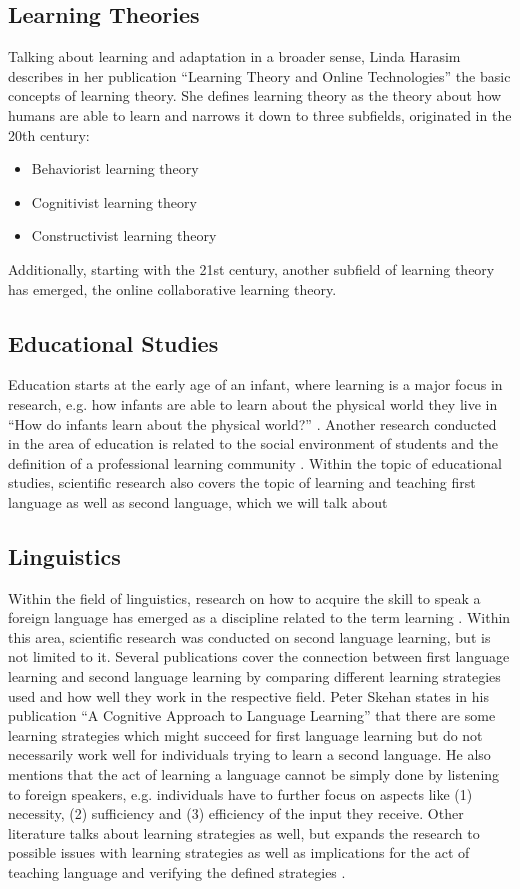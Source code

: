 \documentclass[conference]{IEEEtran}
\begin{document}
	\subsection{Learning Theories}\label{LT}
		Talking about learning and adaptation in a broader sense, Linda Harasim describes in her publication “Learning Theory and Online Technologies” \cite{d1} the basic concepts of learning theory. She defines learning theory as the theory about how humans are able to learn and narrows it down to three subfields, originated in the 20th century:
		\begin{itemize}
			\item Behaviorist learning theory
			\item Cognitivist learning theory
			\item Constructivist learning theory
		\end{itemize}

		Additionally, starting with the 21st century, another subfield of learning theory has emerged, the online collaborative learning theory.

	\subsection{Educational Studies}\label{ES}
		Education starts at the early age of an infant, where learning is a major focus in research, e.g. how infants are able to learn about the physical world they live in ``How do infants learn about the physical world?'' \cite{d2}. Another research conducted in the area of education is related to the social environment of students and the definition of a professional learning community \cite{d3}. Within the topic of educational studies, scientific research also covers the topic of learning and teaching first language as well as second language, which we will talk about

	\subsection{Linguistics}\label{Li}
		Within the field of linguistics, research on how to acquire the skill to speak a foreign language has emerged as a discipline related to the term learning \cite{d4}. Within this area, scientific research was conducted on second language learning, but is not limited to it. Several publications cover the connection between first language learning and second language learning by comparing different learning strategies used and how well they work in the respective field. Peter Skehan states in his publication ``A Cognitive Approach to Language Learning'' \cite{d5} that there are some learning strategies which might succeed for first language learning but do not necessarily work well for individuals trying to learn a second language. He also mentions that the act of learning a language cannot be simply done by listening to foreign speakers, e.g. individuals have to further focus on aspects like (1) necessity, (2) sufficiency and (3) efficiency of the input they receive. Other literature talks about learning strategies as well, but expands the research to possible issues with learning strategies as well as implications for the act of teaching language and verifying the defined strategies \cite{d6}.
\end{document}
